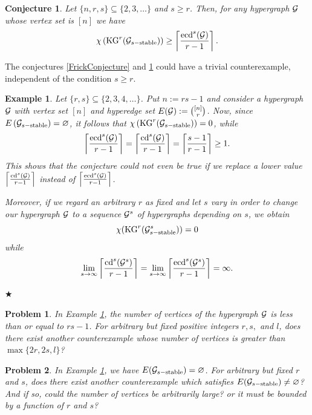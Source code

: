 \documentclass[11pt]{article}
\newtheorem{precon}{{\bf Conjecture}}
\newenvironment{con}{\begin{precon}{\hspace{-0.5
               em}{\bf.\ }}}{\end{precon}}
\newtheorem{preexm}{{\bf Example}}
\newenvironment{exm}[1]{\begin{preexm}{\hspace{-0.5
                  em}{\bf.\ }}{\rm #1}\hfill{$\bigstar$}}{\end{preexm}}
\newtheorem{preprb}{{\bf Problem}}
\newenvironment{prb}{\begin{preprb}{\hspace{-0.5
               em}{\bf.\ }}}{\end{preprb}}
\begin{document}
\begin{con} \cite{Jafari2022} \label{JafariConjecture}
	Let $\{n , r , s \} \subseteq \{2,3, \dots\}$ and $s \geq r$.
	Then, for any hypergraph ${\cal G}$ whose vertex set is $[n]$ we have
	$$ \chi \left({\rm KG}^r ({\cal G}_{s-{\rm stable}})\right) \geq
	\left\lceil  \frac{{\rm ecd}^s ({\cal G})}{r-1}   \right\rceil . $$
\end{con}

\noindent
The conjectures \ref{FrickConjecture} and \ref{JafariConjecture} could have a trivial counterexample, independent of the condition $s\geq r$.

\begin{exm}{ \label{Trivial}
		Let $\{r,s\} \subseteq \{2,3,4, \dots\}$. Put $n:=rs-1$ and consider a hypergraph
		${\cal G}$ with vertex set $[n]$ and hyperedge set $E({\cal G}) := {[n] \choose r}$.
		Now, since $E \left({\cal G}_{s-{\rm stable}}\right) = \varnothing$,
		it follows that
		$ \chi \left({\rm KG}^r ({\cal G}_{s-{\rm stable}})\right) = 0 $, while
		$$\left\lceil  \frac{{\rm ecd}^s ({\cal G})}{r-1}   \right\rceil = \left\lceil  \frac{{\rm cd}^s ({\cal G})}{r-1}   \right\rceil =
		\left\lceil  \frac{s-1}{r-1}   \right\rceil  \geq 1.$$
		This shows that the conjecture could not even be true if we replace a lower value
		$\left\lceil  \frac{{\rm cd}^s ({\cal G})}{r-1}   \right\rceil $
		instead of $\left\lceil  \frac{{\rm ecd}^s ({\cal G})}{r-1}   \right\rceil $.
		
		\noindent
		Moreover, if we regard an arbitrary $r$ as fixed and let $s$ vary in order to change our hypergraph ${\cal G}$ to a sequence ${\cal G}^{s}$ of hypergraphs depending on $s$,
		we obtain
		$$\chi ({\rm KG}^r ({\cal G}^{s}_{s-{\rm stable}}))=0 $$
		while
		$$\lim _{s \to \infty}\left\lceil  \frac{{\rm cd}^s ({\cal G}^{s})}{r-1}   \right\rceil
		=
		\lim _{s \to \infty}\left\lceil  \frac{{\rm ecd}^s ({\cal G}^{s})}{r-1}   \right\rceil
		=
		\infty .
		$$
	}
\end{exm}

\begin{prb} \label{GeneralProblem1}
	In Example \ref{Trivial}, the number of vertices of the hypergraph ${\cal G}$ is less than or equal to $rs-1$. For arbitrary but fixed positive integers $r, s,$ and $l$, does there exist another counterexample whose number of vertices is greater than $\max \{2r , 2s , l\}$?
\end{prb}

\begin{prb} \label{GeneralProblem2}
	In Example \ref{Trivial}, we have
	$E({\cal G}_{s-{\rm stable}}) = \varnothing$. For arbitrary but fixed $r$ and $s$, does there exist another counterexample which satisfies $E({\cal G}_{s-{\rm stable}}) \neq \varnothing$? And if so, could the number of vertices be arbitrarily large? or it must be bounded by a function of $r$ and $s$?  
\end{prb}
\end{document}
